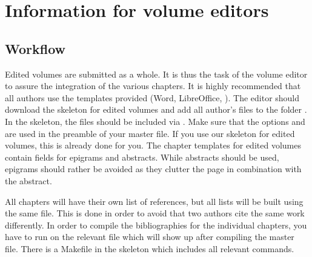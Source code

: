 \chapter{Information for volume editors}
\section{Workflow}
Edited volumes are submitted as a whole. It is thus the task of the volume editor to assure the integration of the various chapters. It is highly recommended that all authors use the templates provided (Word, LibreOffice, \latex). The editor should download the skeleton for edited volumes and add all author's files to the folder . In the skeleton, the files should be included via . Make sure that the options  and  are used in the preamble of your master file. If you use our skeleton for edited volumes, this is already done for you. 
The chapter templates for edited volumes contain fields for epigrams and abstracts. While abstracts should be used, epigrams should rather be avoided as they clutter the page in combination with the abstract. 



All chapters will have their own list of references, but all lists will be built using the same {\bibtex} file. This is done in order to avoid that two authors cite the same work differently. In order to compile the bibliographies for the individual chapters, you have to run {\bibtex} on the relevant  file which will show up after compiling the master file. There is a Makefile in the skeleton which includes all relevant commands.
     